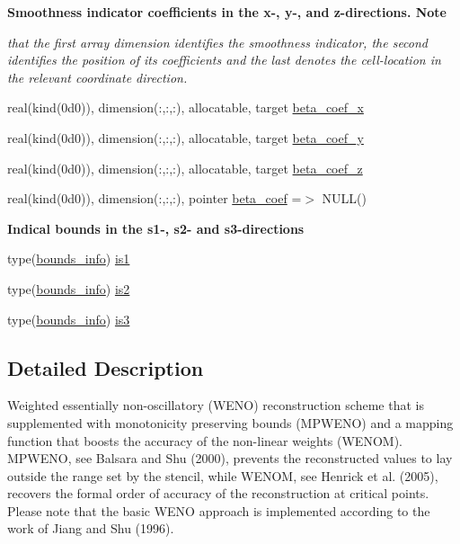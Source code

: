 \begin{Indent}\textbf{ Smoothness indicator coefficients in the x-\/, y-\/, and z-\/directions. Note}\par
{\em that the first array dimension identifies the smoothness indicator, the second identifies the position of its coefficients and the last denotes the cell-\/location in the relevant coordinate direction. }\begin{DoxyCompactItemize}
\item 
real(kind(0d0)), dimension(\+:,\+:,\+:), allocatable, target \hyperlink{namespacem__weno_a134c95205f767fc0d36631c6426eaad9}{beta\+\_\+coef\+\_\+x}
\item 
real(kind(0d0)), dimension(\+:,\+:,\+:), allocatable, target \hyperlink{namespacem__weno_aa1574c8b4d69b5e40fa2ec0c86816136}{beta\+\_\+coef\+\_\+y}
\item 
real(kind(0d0)), dimension(\+:,\+:,\+:), allocatable, target \hyperlink{namespacem__weno_aea41f263d17898f7dbe955a7ff6edff7}{beta\+\_\+coef\+\_\+z}
\item 
real(kind(0d0)), dimension(\+:,\+:,\+:), pointer \hyperlink{namespacem__weno_a9dc5624a505436521a68a439e02ade3d}{beta\+\_\+coef} =$>$ N\+U\+LL()
\end{DoxyCompactItemize}
\end{Indent}
\begin{Indent}\textbf{ Indical bounds in the s1-\/, s2-\/ and s3-\/directions}\par
\begin{DoxyCompactItemize}
\item 
type(\hyperlink{structm__derived__types_1_1bounds__info}{bounds\+\_\+info}) \hyperlink{namespacem__weno_ac3ef0890373b2575a3bd9ed112c31865}{is1}
\item 
type(\hyperlink{structm__derived__types_1_1bounds__info}{bounds\+\_\+info}) \hyperlink{namespacem__weno_aceec79b8e24447024e5ccbc46f42300f}{is2}
\item 
type(\hyperlink{structm__derived__types_1_1bounds__info}{bounds\+\_\+info}) \hyperlink{namespacem__weno_a705812a0239b1d121413020e61ef25bc}{is3}
\end{DoxyCompactItemize}
\end{Indent}


\subsection{Detailed Description}
Weighted essentially non-\/oscillatory (W\+E\+NO) reconstruction scheme that is supplemented with monotonicity preserving bounds (M\+P\+W\+E\+NO) and a mapping function that boosts the accuracy of the non-\/linear weights (W\+E\+N\+OM). M\+P\+W\+E\+NO, see Balsara and Shu (2000), prevents the reconstructed values to lay outside the range set by the stencil, while W\+E\+N\+OM, see Henrick et al. (2005), recovers the formal order of accuracy of the reconstruction at critical points. Please note that the basic W\+E\+NO approach is implemented according to the work of Jiang and Shu (1996). 

